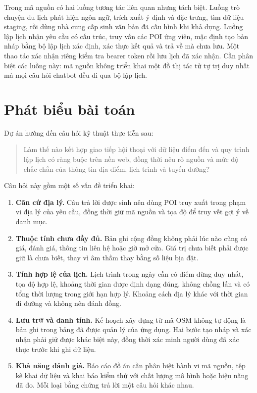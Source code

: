 Trong mã nguồn có hai luồng tương tác liên quan nhưng tách biệt. Luồng trò chuyện du lịch phát hiện ngôn ngữ, trích xuất ý định và đặc trưng, tìm dữ liệu staging, rồi dùng nhà cung cấp sinh văn bản đã cấu hình khi khả dụng. Luồng lập lịch nhận yêu cầu có cấu trúc, truy vấn các POI ứng viên, mặc định tạo bản nháp bằng bộ lập lịch xác định, xác thực kết quả và trả về mà chưa lưu. Một thao tác xác nhận riêng kiểm tra bearer token rồi lưu lịch đã xác nhận. Cần phân biệt các luồng này: mã nguồn không triển khai một đồ thị tác tử tự trị duy nhất mà mọi câu hỏi chatbot đều đi qua bộ lập lịch.

\section{Phát biểu bài toán}

Dự án hướng đến câu hỏi kỹ thuật thực tiễn sau:
\begin{quote}
Làm thế nào kết hợp giao tiếp hội thoại với dữ liệu điểm đến và quy trình lập lịch có ràng buộc trên nền web, đồng thời nêu rõ nguồn và mức độ chắc chắn của thông tin địa điểm, lịch trình và tuyến đường?
\end{quote}

Câu hỏi này gồm một số vấn đề triển khai:
\begin{enumerate}[leftmargin=1.8em,itemsep=4pt]
    \item \textbf{Căn cứ địa lý.} Câu trả lời được sinh nên dùng POI truy xuất trong phạm vi địa lý của yêu cầu, đồng thời giữ mã nguồn và tọa độ để truy vết gợi ý về danh mục.
    \item \textbf{Thuộc tính chưa đầy đủ.} Bản ghi cộng đồng không phải lúc nào cũng có giá, đánh giá, thông tin liên hệ hoặc giờ mở cửa. Giá trị chưa biết phải được giữ là chưa biết, thay vì âm thầm thay bằng số liệu bịa đặt.
    \item \textbf{Tính hợp lệ của lịch.} Lịch trình trong ngày cần có điểm dừng duy nhất, tọa độ hợp lệ, khoảng thời gian được định dạng đúng, không chồng lấn và có tổng thời lượng trong giới hạn hợp lý. Khoảng cách địa lý khác với thời gian đi đường và không nên đánh đồng.
    \item \textbf{Lưu trữ và danh tính.} Kế hoạch xây dựng từ mã OSM không tự động là bản ghi trong bảng  đã được quản lý của ứng dụng. Hai bước tạo nháp và xác nhận phải giữ được khác biệt này, đồng thời xác minh người dùng đã xác thực trước khi ghi dữ liệu.
    \item \textbf{Khả năng đánh giá.} Báo cáo đồ án cần phân biệt hành vi mã nguồn, tệp kê khai dữ liệu và khai báo kiểm thử với chất lượng mô hình hoặc hiệu năng đã đo. Mỗi loại bằng chứng trả lời một câu hỏi khác nhau.
\end{enumerate}

